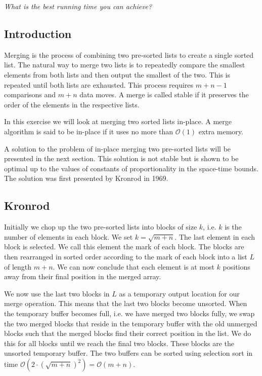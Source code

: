 \documentclass[a4paper,oneside,article,11pt]{memoir}
\begin{document}
\textit{What is the best running time you can achieve?}

\subsection{Introduction}
Merging is the process of combining two pre-sorted lists to create a single sorted list. The natural way to merge two lists is to repeatedly compare the smallest elements from both lists and then output the smallest of the two. This is repeated until both lists are exhausted. This process requires $m+n-1$ comparisons and $m+n$ data moves. A merge is called stable if it preserves the order of the elements in the respective lists.

In this exercise we will look at merging two sorted lists in-place. A merge algorithm is said to be in-place if it uses no more than $\mathcal{O}(1)$ extra memory.

A solution to the problem of in-place merging two pre-sorted lists will be presented in the next section. This solution is not stable but is shown to be optimal up to the values of constants of proportionality in the space-time bounds. The solution was first presented by Kronrod in 1969\cite{Kronrod}.

\subsection{Kronrod}
Initially we chop up the two pre-sorted lists into blocks of size $k$, i.e. $k$ is the number of elements in each block. We set $k =\sqrt{m+n}$. The last element in each block is selected. We call this element the mark of each block. The blocks are then rearranged in sorted order according to the mark of each block into a list $L$ of length $m+n$. We can now conclude that each element is at most $k$ positions away from their final position in the merged array.

We now use the last two blocks in $L$ as a temporary output location for our merge operation. This means that the last two blocks become unsorted. When the temporary buffer becomes full, i.e. we have merged two blocks fully, we swap the two merged blocks that reside in the temporary buffer with the old unmerged blocks such that the merged blocks find their correct position in the list. We do this for all blocks until we reach the final two blocks. These blocks are the unsorted temporary buffer. The two buffers can be sorted using selection sort in time $\mathcal{O}(2\cdot\left(\sqrt{m+n}\right)^2) = \mathcal{O}(m+n)$.
\end{document}
